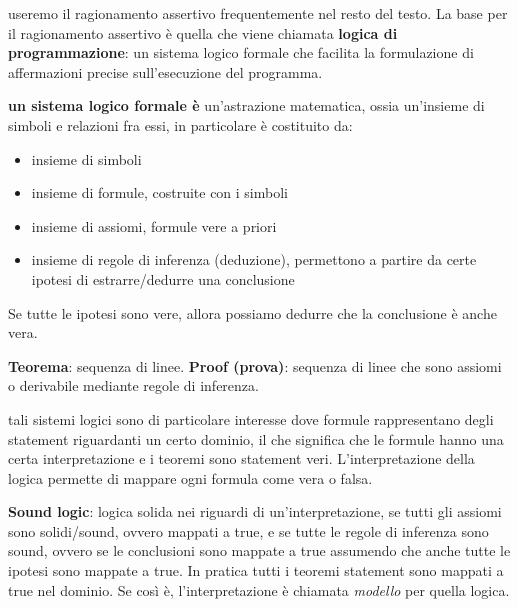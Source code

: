 \documentclass[10pt,a4paper]{book}
\begin{document}
useremo il ragionamento assertivo frequentemente nel resto del testo.
La base per il ragionamento assertivo è quella che viene chiamata \textbf{logica di programmazione}:
un sistema logico formale che facilita la formulazione di affermazioni precise sull'esecuzione del programma.

\textbf{un sistema logico formale è} un'astrazione matematica, ossia un'insieme di simboli e relazioni fra essi, in particolare è costituito da:
\begin{itemize}
\item insieme di simboli
\item insieme di formule, costruite con i simboli
\item insieme di assiomi, formule vere a priori
\item insieme di regole di inferenza (deduzione), permettono a partire da certe ipotesi di estrarre/dedurre una conclusione
\end{itemize}
Se tutte le ipotesi sono vere, allora possiamo dedurre che la conclusione è anche vera.

\textbf{Teorema}: sequenza di linee.
\textbf{Proof (prova)}: sequenza di linee che sono assiomi o derivabile mediante regole di inferenza.

tali sistemi logici sono di particolare interesse dove formule rappresentano degli statement riguardanti un certo dominio, il che significa che le formule hanno una certa interpretazione e i teoremi sono statement veri.
L'interpretazione della logica permette di mappare ogni formula come vera o falsa.

\textbf{Sound logic}: logica solida nei riguardi di un'interpretazione, se tutti gli assiomi sono solidi/sound, ovvero mappati a true, e se tutte le regole di inferenza sono sound, ovvero se le conclusioni sono mappate a true assumendo che anche tutte le ipotesi sono mappate a true.
In pratica tutti i teoremi statement sono mappati a true nel dominio. Se così è, l'interpretazione è chiamata \textit{modello} per quella logica.
\end{document}
